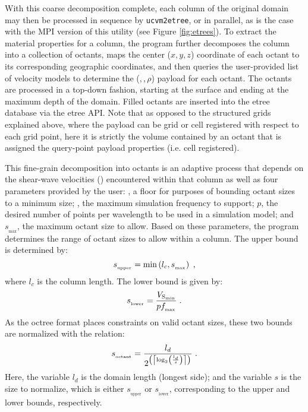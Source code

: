 With this coarse decomposition complete, each column of the original domain may then be processed in sequence by \texttt{ucvm2etree}, or in parallel, as is the case with the MPI version of this utility (see Figure \ref{fig:etrees}). To extract the material properties for a column, the program further decomposes the column into a collection of octants, maps the center ($x,y,z$) coordinate of each octant to its corresponding geographic coordinates, and then queries the user-provided list of velocity models to determine the (\vp{},\,\vs{},\,$\rho$) payload for each octant. The octants are processed in a top-down fashion, starting at the surface and ending at the maximum depth of the domain. Filled octants are inserted into the etree database via the etree API. Note that as opposed to the structured grids explained above, where the payload can be grid or cell registered with respect to each grid point, here it is strictly the volume contained by an octant that is assigned the query-point payload properties (i.e. cell registered).

This fine-grain decomposition into octants is an adaptive process that depends on the shear-wave velocities (\vs{}) encountered within that column as well as four parameters provided by the user: \vsmin{}, a floor \vs{} for purposes of bounding octant sizes to a minimum size; \fmax{}, the maximum simulation frequency to support; $p$, the desired number of points per wavelength to be used in a simulation model; and $s_{_{\max}}$, the maximum octant size to allow. Based on these parameters, the program determines the range of octant sizes to allow within a column. The upper bound is determined by:
%
\begin{equation}
\label{eq:octant_upper}
	s_{_{\mathrm{upper}}} = \min \left( l_c, s_{_{\max}} \right)
	\hspace{0.3em},
\end{equation}
%
where $l_c$ is the column length. The lower bound is given by:
%
\begin{equation}
\label{eq:octant_lower}
	s_{_{\mathrm{lower}}} = \frac{ V_{\mathrm{S}_{\min}} }{ p f_{_{\max}}}
	\hspace{0.3em}.
\end{equation}
%
As the octree format places constraints on valid octant sizes, these two bounds are normalized with the relation:
%
\begin{equation}
\label{eq:octant_size}
	s_{_{\mathrm{octant}}} = \frac{ l_d }{ 2^{ \left( \left\lceil \log_{2} \left( \frac{l_d}{s} \right) \right\rceil \right)} }
	\hspace{0.3em}.
\end{equation}
%
Here, the variable $l_d$ is the domain length (longest side); and the variable $s$ is the size to normalize, which is either $s_{_{\mathrm{upper}}}$ or $s_{_{\mathrm{lower}}}$, corresponding to the upper and lower bounds, respectively.

